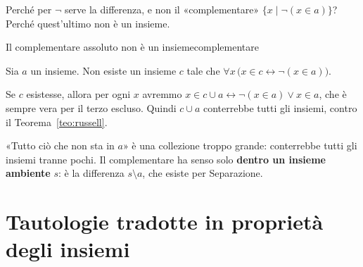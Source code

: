 Perché per $\neg$ serve la differenza, e non il «complementare» $\{x \mid \neg(x \in a)\}$? Perché quest'ultimo non è un insieme.

\begin{concetto}
\begin{Corollario}{Il complementare assoluto non è un insieme}{complementare}
    \begin{prerequisiti}
    \end{prerequisiti}
    Sia $a$ un insieme. Non esiste un insieme $c$ tale che $\forall x\,\big(x \in c \leftrightarrow \neg(x \in a)\big)$.
\end{Corollario}
\begin{dimostrazione}
    Se $c$ esistesse, allora per ogni $x$ avremmo $x \in c \cup a \leftrightarrow \neg(x \in a) \vee x \in a$, che è sempre
    vera per il terzo escluso. Quindi $c \cup a$ conterrebbe tutti gli insiemi, contro il Teorema~\ref{teo:russell}.
\end{dimostrazione}
\end{concetto}

\begin{spiegazione}
    «Tutto ciò che non sta in $a$» è una collezione troppo grande: conterrebbe tutti gli insiemi tranne pochi. Il complementare ha senso solo
    \textbf{dentro un insieme ambiente} $s$: è la differenza $s \setminus a$, che esiste per Separazione.
    \begin{center}
    \end{center}
\end{spiegazione}


\section{Tautologie tradotte in proprietà degli insiemi}\label{sec:traduzioni}

